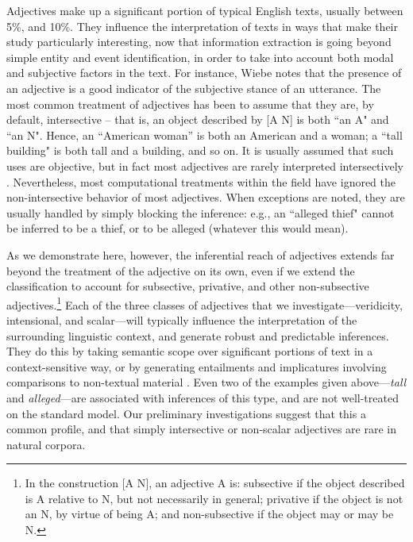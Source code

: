 \documentclass[10pt]{article}
\begin{document}
Adjectives make up a significant portion of typical English texts, usually between 5\%, and 10\%. They influence the interpretation of texts in ways that make their study particularly interesting, now that information extraction is going beyond simple entity and event identification, in order to take into account both modal and subjective factors in the text. For instance, Wiebe \cite{wiebe00learningsubjective} notes that the presence of an adjective is a good indicator of the subjective stance of an utterance.
 The most common treatment of adjectives has been to assume that they are, by default, {\sc intersective} -- that is, an object described by [A N] is both ``an A" and ``an N". Hence, an ``American woman'' is both an American and a woman; a ``tall building" is both tall and a building, and so on. 
It is usually assumed that such uses are objective, but in fact most adjectives are rarely interpreted intersectively \cite{giegerich2005associative}. Nevertheless, most computational treatments  within the field have ignored the non-intersective behavior of most adjectives.   When exceptions are noted, they are usually handled by simply blocking the inference: e.g., an ``alleged thief" cannot be inferred to be a thief, or to be alleged (whatever this would mean). 


As we demonstrate here, however,  the inferential reach of adjectives extends far beyond the treatment of the adjective on its own,  even if we extend the classification to  account for subsective, privative, and other non-subsective adjectives.\footnote{
In the construction $[$A N$]$, an adjective A is:  {\sc subsective} if the object described is A relative to N, but not necessarily in general; {\sc privative} if the object 
is not an N, by virtue of being A; and 
{\sc non-subsective} if the object may or may be N.}
Each of the three classes of adjectives that we investigate---veridicity, intensional, and scalar---will typically influence the interpretation  of the surrounding linguistic context, and generate robust and predictable inferences.  They do this by taking semantic scope over significant portions of text in a context-sensitive way, or by generating entailments and implicatures involving comparisons to non-textual material 
\cite{lassiter14adjectives}. 
%
Even two of the examples given above---\emph{tall} and \emph{alleged}---are associated with inferences of this type, and are not well-treated on the standard model. Our preliminary investigations suggest that this a common profile, and that simply intersective or non-scalar adjectives are rare in natural corpora.
\end{document}

